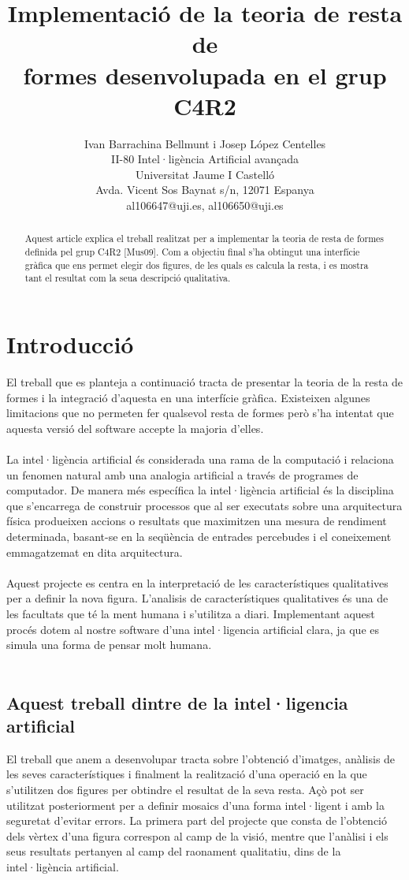 \documentclass{article}
\title{Implementació de la teoria de resta de\\formes desenvolupada en el grup C4R2}
\author{Ivan Barrachina Bellmunt i Josep López Centelles\\
II-80 Intel·ligència Artificial avançada\\
Universitat Jaume I Castelló\\
Avda. Vicent Sos Baynat s/n, 12071 Espanya \\
al106647@uji.es, al106650@uji.es}
\begin{document}
\maketitle

\begin{abstract}
Aquest article explica el treball realitzat per a implementar la teoria de resta de formes definida pel grup C4R2 [Mus09].
Com a objectiu final s'ha obtingut una interfície gràfica que ens permet elegir dos figures, de les quals es calcula la resta, i es mostra tant el resultat com la seua descripció qualitativa.
\end{abstract}

\section{Introducció}
El treball que es planteja a continuació tracta de presentar la teoria de la resta de formes i la integració d'aquesta en una interfície gràfica.
Existeixen algunes limitacions que no permeten fer qualsevol resta de formes però s'ha intentat que aquesta versió del software accepte la majoria d'elles.
\\
\\
La intel·ligència artificial és considerada una rama de la computació i relaciona un fenomen natural amb una analogia artificial a través de programes de computador.
De manera més específica la intel·ligència artificial és la disciplina que s'encarrega de construir processos que al ser executats sobre una arquitectura física produeixen accions o resultats que maximitzen una mesura de rendiment determinada, basant-se en la seqüència de entrades percebudes i el coneixement emmagatzemat en dita arquitectura.
\\
\\
Aquest projecte es centra en la interpretació de les característiques qualitatives per a definir la nova figura.
L'analisis de característiques qualitatives és una de les facultats que té la ment humana i s'utilitza a diari.
Implementant aquest procés dotem al nostre software d'una intel·ligencia artificial clara, ja que es simula una forma de pensar molt humana.
\\
\\
\subsection{Aquest treball dintre de la intel·ligencia artificial}
El treball que anem a desenvolupar tracta sobre l'obtenció d'imatges, anàlisis de les seves característiques i finalment la realització d'una operació en la que s'utilitzen dos figures per obtindre el resultat de la seva resta.
Açò pot ser utilitzat posteriorment per a definir mosaics d'una forma intel·ligent i amb la seguretat d'evitar errors.
La primera part del projecte que consta de l'obtenció dels vèrtex d'una figura correspon al camp de la visió, mentre que l'anàlisi i els seus resultats pertanyen al camp del raonament qualitatiu, dins de la intel·ligència artificial.
\\
\end{document}
